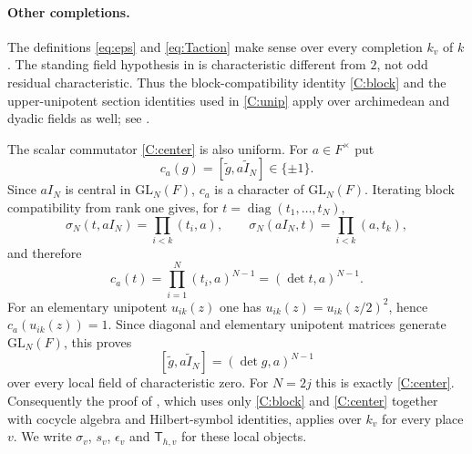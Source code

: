 \documentclass[11pt,oneside,notitlepage]{book}
\numberwithin{equation}{section}
\theoremstyle{plain}
\theoremstyle{definition}
\newcommand{\GL}{\mathrm{GL}}
\newcommand{\diag}{\operatorname{diag}}
\newcommand{\hil}[2]{(#1,#2)}
\newcommand{\T}{\mathsf{T}}
\begin{document}
\paragraph{Other completions.}
The definitions \eqref{eq:eps} and \eqref{eq:Taction} make sense over every completion $k_v$ of $k$. The standing field hypothesis in \cite[\S1.1]{KM} is characteristic different from $2$, not odd residual characteristic. Thus the block-compatibility identity \ref{C:block} and the upper-unipotent section identities used in \ref{C:unip} apply over archimedean and dyadic fields as well; see \cite[\S1.2, (1.1) and the paragraph following (1.2)]{KM}.


The scalar commutator \ref{C:center} is also uniform. For $a\in F^\times$ put
\[
c_a(g)=[\tilde g,\widetilde{aI_N}]\in\{\pm1\}.
\]
Since $aI_N$ is central in $\GL_N(F)$, $c_a$ is a character of $\GL_N(F)$. Iterating block compatibility from rank one gives, for $t=\diag(t_1,\ldots,t_N)$,
\[
\sigma_N(t,aI_N)=\prod_{i<k}\hil{t_i}{a},
\qquad
\sigma_N(aI_N,t)=\prod_{i<k}\hil{a}{t_k},
\]
and therefore
\[
c_a(t)=\prod_{i=1}^N\hil{t_i}{a}^{N-1}
=\hil{\det t}{a}^{N-1}.
\]
For an elementary unipotent $u_{ik}(z)$ one has $u_{ik}(z)=u_{ik}(z/2)^2$, hence $c_a(u_{ik}(z))=1$. Since diagonal and elementary unipotent matrices generate $\GL_N(F)$, this proves
\[
[\tilde g,\widetilde{aI_N}]=\hil{\det g}{a}^{N-1}
\]
over every local field of characteristic zero. For $N=2j$ this is exactly \ref{C:center}. Consequently the proof of , which uses only \ref{C:block} and \ref{C:center} together with cocycle algebra and Hilbert-symbol identities, applies over $k_v$ for every place $v$. We write $\sigma_v$, $s_v$, $\epsilon_v$ and $\T_{h,v}$ for these local objects. 

\end{document}
